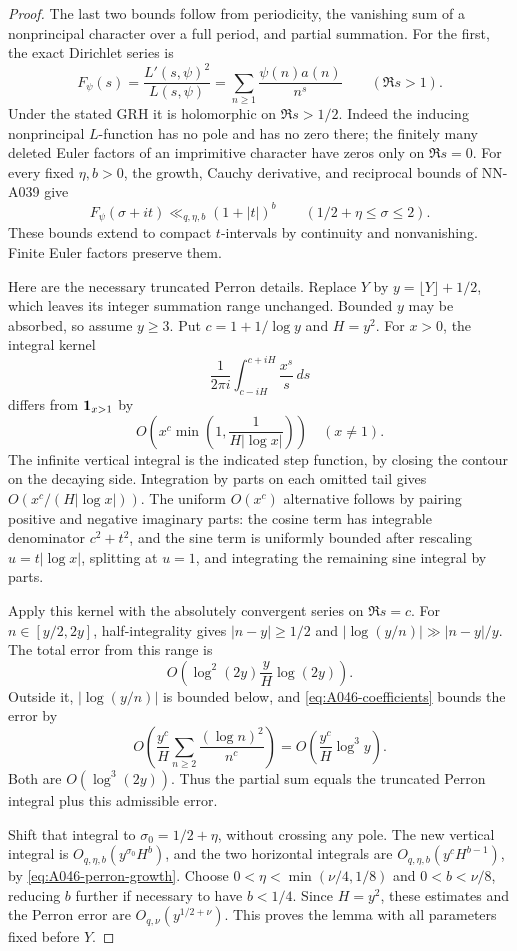 \begin{proof}
The last two bounds follow from periodicity, the vanishing
sum of a nonprincipal character over a full period, and
partial summation. For the first, the exact Dirichlet series is
\[
 F_\psi(s)=\frac{L'(s,\psi)^2}{L(s,\psi)}
                     =\sum_{n\ge1}\frac{\psi(n)a(n)}{n^s}
                       \qquad(\Re s>1).
\]
Under the stated GRH it is holomorphic on \(\Re s>1/2\).
Indeed the inducing nonprincipal \(L\)-function has no pole
and has no zero there; the finitely many deleted Euler factors
of an imprimitive character have zeros only on \(\Re s=0\).
For every fixed \(\eta,b>0\), the growth, Cauchy derivative,
and reciprocal bounds of NN-A039 give
\begin{equation}\label{eq:A046-perron-growth}
        F_\psi(\sigma+it)\ll_{q,\eta,b}(1+|t|)^b
                   \qquad(1/2+\eta\le\sigma\le2).
\end{equation}
These bounds extend to compact \(t\)-intervals by continuity
and nonvanishing. Finite Euler factors preserve them.

Here are the necessary truncated Perron details. Replace \(Y\)
by \(y=\lfloor Y\rfloor+1/2\), which leaves its integer
summation range unchanged. Bounded \(y\) may be absorbed, so
assume \(y\ge3\). Put \(c=1+1/\log y\) and \(H=y^2\).
For \(x>0\), the integral kernel
\[
      \frac1{2\pi i}\int_{c-iH}^{c+iH}\frac{x^s}{s}\,ds
\]
differs from \({\bf1}_{x>1}\) by
\[
              O\!\left(x^c
                     \min\left(1,\frac1{H|\log x|}\right)\right)
                       \quad(x\ne1).
\]
The infinite vertical integral is the indicated step
function, by closing the contour on the decaying side.
Integration by parts on each omitted tail gives
\(O(x^c/(H|\log x|))\). The uniform \(O(x^c)\) alternative
follows by pairing positive and negative imaginary parts:
the cosine term has integrable denominator \(c^2+t^2\),
and the sine term is uniformly bounded after rescaling
\(u=t|\log x|\), splitting at \(u=1\), and integrating
the remaining sine integral by parts.

Apply this kernel with the absolutely convergent series on
\(\Re s=c\). For \(n\in[y/2,2y]\), half-integrality gives
\(|n-y|\ge1/2\) and
\(|\log(y/n)|\gg |n-y|/y\).
The total error from this range is
\[
               O\left(\log^2(2y)\frac yH\log(2y)\right).
\]
Outside it, \(|\log(y/n)|\) is bounded below, and
\eqref{eq:A046-coefficients} bounds the error by
\[
       O\left(\frac{y^c}{H}
                       \sum_{n\ge2}\frac{(\log n)^2}{n^c}\right)
                  =O\left(\frac{y^c}{H}\log^3y\right).
\]
Both are \(O(\log^3(2y))\). Thus the partial sum equals
the truncated Perron integral plus this admissible error.

Shift that integral to \(\sigma_0=1/2+\eta\), without
crossing any pole. The new vertical integral is
\(O_{q,\eta,b}(y^{\sigma_0}H^b)\), and the two horizontal
integrals are \(O_{q,\eta,b}(y^cH^{b-1})\), by
\eqref{eq:A046-perron-growth}.
Choose \(0<\eta<\min(\nu/4,1/8)\) and \(0<b<\nu/8\),
reducing \(b\) further if necessary to have \(b<1/4\).
Since \(H=y^2\), these estimates and the Perron error are
\(O_{q,\nu}(y^{1/2+\nu})\). This proves the lemma with
all parameters fixed before \(Y\).
\end{proof}

